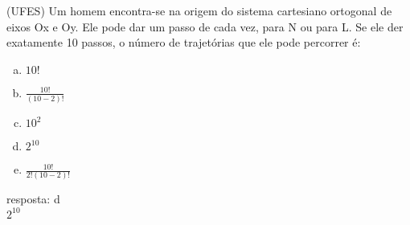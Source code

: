 \begin{ex}
(UFES) Um homem encontra-se na origem do sistema cartesiano ortogonal de eixos Ox e Oy. Ele pode dar um passo de cada vez, para N ou para L. Se ele der exatamente 10 passos, o número de trajetórias que ele pode percorrer é:
   \begin{enumerate}[(a)]
   \item $10!$
   \item $\frac{10!}{(10-2)!}$
   \item ${10}^2$
   \item $2^{10}$
   \item $\frac{10!}{2!(10-2)!}$
   \end{enumerate}
     \begin{sol}
       resposta: d \\
       $2^{10}$
     \end{sol}
\end{ex}
